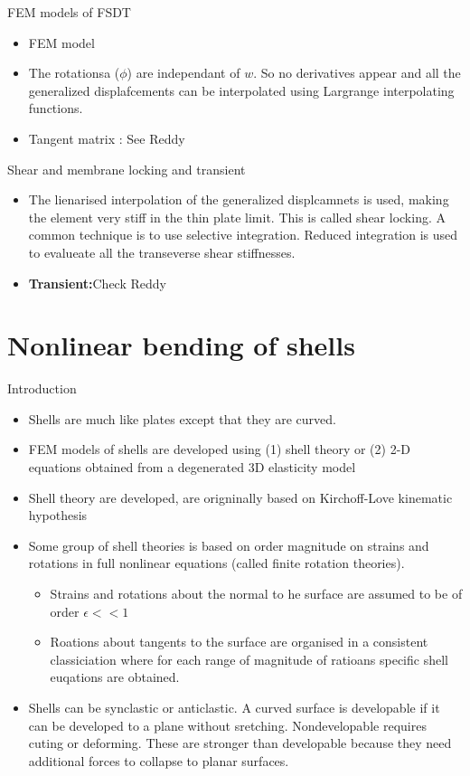 	\begin{frame}{FEM models of FSDT}
		\begin{itemize}
			\item FEM model
			\item  The rotationsa ($\phi$) are independant of $w$. So no derivatives appear and all the  generalized displafcements can be interpolated using Largrange interpolating functions.
			\item Tangent matrix : See Reddy
			
		\end{itemize}
	\end{frame}


	\begin{frame}{Shear and membrane locking and transient}
		\begin{itemize}
			\item The lienarised interpolation of the generalized displcamnets is used, making the element very stiff in the thin plate limit. This is called shear locking. A common technique is to use selective integration. Reduced integration is used to evalueate all the transeverse shear stiffnesses.			
			\item \textbf{Transient:}Check Reddy
	\end{itemize}
	\end{frame}


\section{Nonlinear bending of shells}

	
	\begin{frame}{Introduction}
		\begin{itemize}
			\item Shells are much like plates except that they are curved. 
			\item FEM models of shells are developed using (1) shell theory or (2) 2-D equations obtained from a degenerated 3D elasticity model 
			\item Shell theory are developed, are origninally based on Kirchoff-Love kinematic hypothesis
			\item Some group of shell theories is based on order magnitude on strains and rotations in full nonlinear equations (called finite rotation theories). 
			\begin{itemize}
				\item Strains and rotations about the normal to he surface are assumed to be of order $\epsilon<<1$
				\item Roations about tangents to the surface are organised in a consistent classiciation where for each range of magnitude of ratioans specific shell euqations are obtained. 
			\end{itemize}
		\item Shells can be synclastic or anticlastic. A curved surface is developable if it can be developed to a plane without sretching. Nondevelopable requires cuting or deforming. These are stronger than developable because they need additional forces to collapse to planar surfaces. 
		\end{itemize}
	\end{frame}



